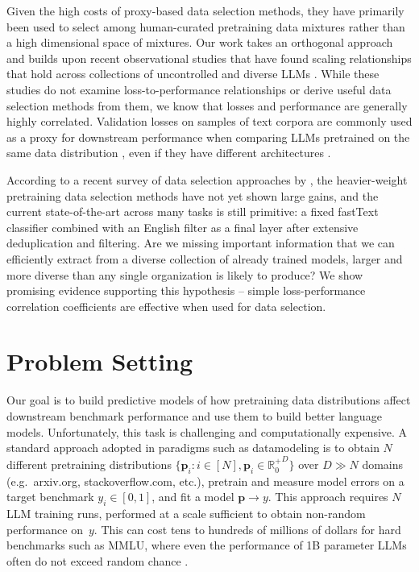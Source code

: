 \documentclass{article} %
\begin{document}
Given the high costs of proxy-based data selection methods, they have primarily been used to select among human-curated pretraining data mixtures \citep{llama3, datacomp} rather than a high dimensional space of mixtures. Our work takes an orthogonal approach and builds upon recent observational studies that have found scaling relationships that hold across collections of uncontrolled and diverse LLMs \citep{owen2024predictable,ruan2024observationalscalinglawspredictability}. While these studies do not examine loss-to-performance relationships or derive useful data selection methods from them, we know that losses and performance are generally highly correlated. Validation losses on samples of text corpora are commonly used as a proxy for downstream performance when comparing LLMs pretrained on the same data distribution \citep{kaplan2020scaling, chinchilla, wei2022emergent}, even if they have different architectures \citep{hyena, rwkv, mamba}.

According to a recent survey of data selection approaches by \citet{datacomp}, the heavier-weight pretraining data selection methods have not yet shown large gains, and the current state-of-the-art across many tasks is still primitive: a fixed fastText classifier \citep{fasttext} combined with an English filter as a final layer after extensive deduplication and filtering. Are we missing important information that we can efficiently extract from a diverse collection of already trained models, larger and more diverse than any single organization is likely to produce? We show promising evidence supporting this hypothesis -- simple loss-performance correlation coefficients are effective when used for data selection.

\section{Problem Setting}

Our goal is to build predictive models of how pretraining data distributions affect downstream benchmark performance and use them to build better language models. Unfortunately, this task is challenging and computationally expensive. A standard approach adopted in paradigms such as datamodeling \citep{datamodels} is to obtain $N$ different pretraining distributions $\{\mathbf{p}_i: i\in [N], \mathbf{p}_i\in{\mathbb{R}_0^+}^D\}$ over  $D \gg N$ domains  (e.g.\ arxiv.org, stackoverflow.com, etc.), pretrain and measure model errors on a target benchmark $y_i \in [0,1]$, and fit a model $\mathbf{p} \to y$. This approach requires $N$ LLM training runs, performed at a scale sufficient to obtain non-random performance on~$y$. This can cost tens to hundreds of millions of dollars for hard benchmarks such as MMLU, where even the performance of 1B parameter LLMs often do not exceed random chance \citep{openllmleaderboard}.
\end{document}
